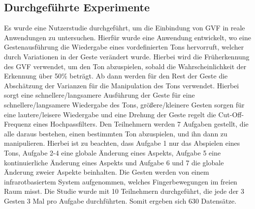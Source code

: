 \documentclass{llncs}
\begin{document}
\subsection{Durchgeführte Experimente}
Es wurde eine Nutzerstudie durchgeführt, um die Einbindung von GVF in reale Anwendungen zu untersuchen. Hierfür wurde eine Anwendung entwickelt, wo eine Gestenausführung die Wiedergabe eines vordefinierten Tons hervorruft, welcher durch Variationen in der Geste verändert wurde. Hierbei wird die Früherkennung des GVF verwendet, um den Ton abzuspielen, sobald die Wahrscheinlichkeit der Erkennung über 50\% beträgt. Ab dann werden für den Rest der Geste die Abschätzung der Varianzen für die Manipulation des Tons verwendet. Hierbei sorgt eine schnellere/langsamere Ausführung der Geste für eine schnellere/langsamere Wiedergabe des Tons, größere/kleinere Gesten sorgen für eine lautere/leisere Wiedergabe und eine Drehung der Geste regelt die Cut-Off-Frequenz eines Hochpassfilters. Den Teilnehmern werden 7 Aufgaben gestellt, die alle daraus bestehen, einen bestimmten Ton abzuspielen, und ihn dann zu manipulieren. Hierbei ist zu beachten, dass Aufgabe 1 nur das Abspielen eines Tons, Aufgabe 2-4 eine globale Änderung eines Aspekts, Aufgabe 5 eine kontinuierliche Änderung eines Aspekts und Aufgabe 6 und 7 die globale Änderung zweier Aspekte beinhalten. Die Gesten werden von einem infrarotbasiertem System aufgenommen, welches Fingerbewegungen im freien Raum misst. Die Studie wurde mit 10 Teilnehmern durchgeführt, die jede der 3 Gesten 3 Mal pro Aufgabe durchführten. Somit ergeben sich 630 Datensätze.


 


\end{document}

